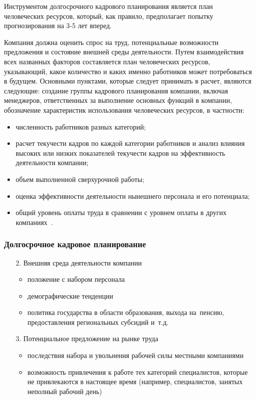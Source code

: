 \documentclass{../industrial-development}
\begin{document}
\lecturenotes

Инструментом долгосрочного кадрового планирования является план человеческих ресурсов, который, как правило, предполагает попытку прогнозирования на 3-5 лет вперед.

Компания должна оценить спрос на труд, потенциальные возможности предложения и состояние внешней среды деятельности. Путем взаимодействия всех названных факторов составляется план человеческих ресурсов, указывающий, какое количество и
каких именно работников может потребоваться в будущем. Основными пунктами, которые следует принимать в расчет, являются следующие: создание группы кадрового планирования компании, включая менеджеров, ответственных за выполнение основных функций в компании, обозначение характеристик использования человеческих ресурсов, в частности:
 \begin{itemize}
\item численность работников разных категорий;
\item расчет текучести кадров по каждой категории работников и анализ влияния высоких
или низких показателей текучести кадров на эффективность деятельности компании;
\item объем выполненной сверхурочной работы;
\item оценка эффективности деятельности нынешнего персонала и его потенциала;
\item общий уровень оплаты труда в сравнении с уровнем оплаты в других компаниях~\cite[с.~86]{Ivanova}.
  \end{itemize}

\begin{frame} \frametitle{Долгосрочное кадровое планирование}
   \begin{itemize}
\item[2.] Внешняя среда деятельности компании
  \begin{itemize}
		\item	положение с набором персонала
		\item	демографические тенденции
		\item политика государства в области образования, выхода на~пенсию, предоставления региональных субсидий и~т.д.
  \end{itemize}

	\item[3.] Потенциальное предложение на рынке труда
	 \begin{itemize}
	\item последствия набора и увольнения рабочей силы местными компаниями
    \item возможность привлечения к работе тех категорий специалистов, которые не привлекаются в настоящее время (например, специалистов, занятых неполный рабочий день)
	\end{itemize}
  \end{itemize}
\end{frame}
\end{document}
